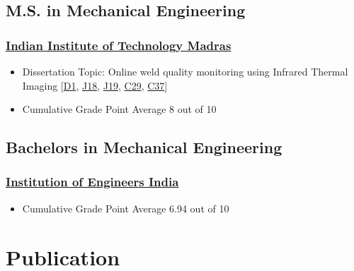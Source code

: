 \documentclass{my_cv}%
\begin{document}
\subsection{M.S. in Mechanical Engineering}
\subsubsection{\faInstitution \hspace{0.2em} \href{https://www.iitm.ac.in/}{Indian Institute of Technology Madras}}
\begin{itemize}[leftmargin=0.15in]
\setlength\itemsep{-0.1em}
\color{mygray}
\item Dissertation Topic: Online weld quality monitoring using Infrared Thermal Imaging [\textcolor{mypink}{\hyperref[D1]{D1}}, \textcolor{mypink}{\hyperref[J18]{J18}}, \textcolor{mypink}{\hyperref[J19]{J19}}, \textcolor{mypink}{\hyperref[C29]{C29}}, \textcolor{mypink}{\hyperref[C37]{C37}}]
\item Cumulative Grade Point Average 8 out of 10
\end{itemize}
{\color{mygray1} \hdashrule[0.1ex]{18.8cm}{0.2mm}{1mm}}
\subsection{Bachelors in Mechanical Engineering}
\subsubsection{\faInstitution \hspace{0.2em} \href{https://www.ieindia.org/webui/iei-home.aspx}{Institution of Engineers India}}
\begin{itemize}[leftmargin=0.15in]
\setlength\itemsep{-0.1em}
\color{mygray}
\item Cumulative Grade Point Average 6.94 out of 10
\end{itemize}
\section{Publication}
\vspace{1em}
%

 
\end{document}
